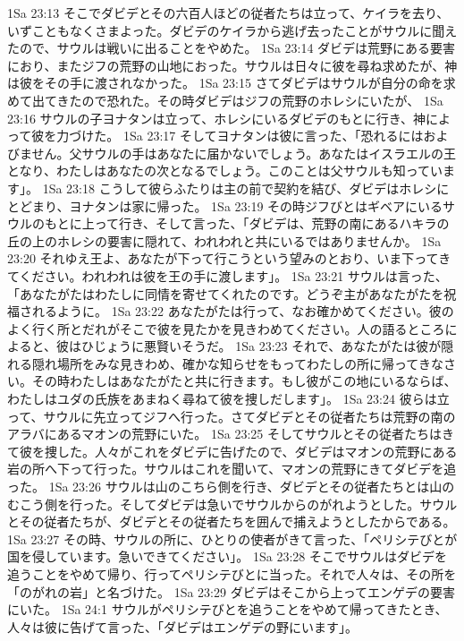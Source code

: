 1Sa 23:13  そこでダビデとその六百人ほどの従者たちは立って、ケイラを去り、いずこともなくさまよった。ダビデのケイラから逃げ去ったことがサウルに聞えたので、サウルは戦いに出ることをやめた。
1Sa 23:14  ダビデは荒野にある要害におり、またジフの荒野の山地におった。サウルは日々に彼を尋ね求めたが、神は彼をその手に渡されなかった。
1Sa 23:15  さてダビデはサウルが自分の命を求めて出てきたので恐れた。その時ダビデはジフの荒野のホレシにいたが、
1Sa 23:16  サウルの子ヨナタンは立って、ホレシにいるダビデのもとに行き、神によって彼を力づけた。
1Sa 23:17  そしてヨナタンは彼に言った、「恐れるにはおよびません。父サウルの手はあなたに届かないでしょう。あなたはイスラエルの王となり、わたしはあなたの次となるでしょう。このことは父サウルも知っています」。
1Sa 23:18  こうして彼らふたりは主の前で契約を結び、ダビデはホレシにとどまり、ヨナタンは家に帰った。
1Sa 23:19  その時ジフびとはギベアにいるサウルのもとに上って行き、そして言った、「ダビデは、荒野の南にあるハキラの丘の上のホレシの要害に隠れて、われわれと共にいるではありませんか。
1Sa 23:20  それゆえ王よ、あなたが下って行こうという望みのとおり、いま下ってきてください。われわれは彼を王の手に渡します」。
1Sa 23:21  サウルは言った、「あなたがたはわたしに同情を寄せてくれたのです。どうぞ主があなたがたを祝福されるように。
1Sa 23:22  あなたがたは行って、なお確かめてください。彼のよく行く所とだれがそこで彼を見たかを見きわめてください。人の語るところによると、彼はひじょうに悪賢いそうだ。
1Sa 23:23  それで、あなたがたは彼が隠れる隠れ場所をみな見きわめ、確かな知らせをもってわたしの所に帰ってきなさい。その時わたしはあなたがたと共に行きます。もし彼がこの地にいるならば、わたしはユダの氏族をあまねく尋ねて彼を捜しだします」。
1Sa 23:24  彼らは立って、サウルに先立ってジフへ行った。さてダビデとその従者たちは荒野の南のアラバにあるマオンの荒野にいた。
1Sa 23:25  そしてサウルとその従者たちはきて彼を捜した。人々がこれをダビデに告げたので、ダビデはマオンの荒野にある岩の所へ下って行った。サウルはこれを聞いて、マオンの荒野にきてダビデを追った。
1Sa 23:26  サウルは山のこちら側を行き、ダビデとその従者たちとは山のむこう側を行った。そしてダビデは急いでサウルからのがれようとした。サウルとその従者たちが、ダビデとその従者たちを囲んで捕えようとしたからである。
1Sa 23:27  その時、サウルの所に、ひとりの使者がきて言った、「ペリシテびとが国を侵しています。急いできてください」。
1Sa 23:28  そこでサウルはダビデを追うことをやめて帰り、行ってペリシテびとに当った。それで人々は、その所を「のがれの岩」と名づけた。
1Sa 23:29  ダビデはそこから上ってエンゲデの要害にいた。
1Sa 24:1  サウルがペリシテびとを追うことをやめて帰ってきたとき、人々は彼に告げて言った、「ダビデはエンゲデの野にいます」。
